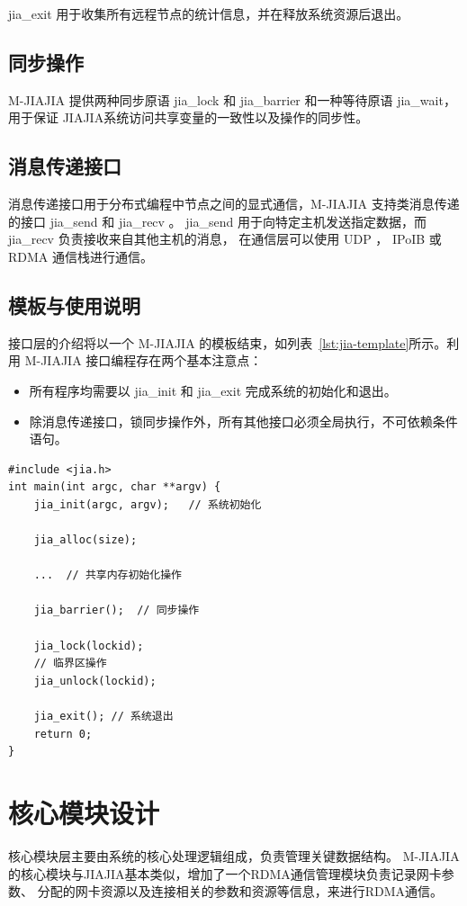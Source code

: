 {    jia\_exit 用于收集所有远程节点的统计信息，并在释放系统资源后退出。
    \subsection{同步操作}
    M-JIAJIA 提供两种同步原语 jia\_lock 和 jia\_barrier 和一种等待原语 jia\_wait，
    用于保证 JIAJIA系统访问共享变量的一致性以及操作的同步性。

    \subsection{消息传递接口}
    消息传递接口用于分布式编程中节点之间的显式通信，M-JIAJIA 支持类消息传递的接口 jia\_send 和 jia\_recv 。
    jia\_send 用于向特定主机发送指定数据，而 jia\_recv 负责接收来自其他主机的消息，
    在通信层可以使用 UDP ， IPoIB 或 RDMA 通信栈进行通信。

    \newpage
    \subsection{模板与使用说明}
    接口层的介绍将以一个 M-JIAJIA 的模板结束，如列表~\ref{lst:jia-template}所示。利用 M-JIAJIA 接口编程存在两个基本注意点：
    \begin{itemize}
        \item 所有程序均需要以 jia\_init 和 jia\_exit 完成系统的初始化和退出。
        \item 除消息传递接口，锁同步操作外，所有其他接口必须全局执行，不可依赖条件语句。
    \end{itemize}
    \begin{lstlisting}[style=CStyle, caption={M-JIAJIA 应用模板}, label={lst:jia-template}]
#include <jia.h>
int main(int argc, char **argv) {
    jia_init(argc, argv);   // 系统初始化

    jia_alloc(size);
    
    ...  // 共享内存初始化操作

    jia_barrier();  // 同步操作    

    jia_lock(lockid);
    // 临界区操作
    jia_unlock(lockid);
    
    jia_exit(); // 系统退出
    return 0;
}
    \end{lstlisting}

    \section{核心模块设计}\label{sec:核心模块设计}
    核心模块层主要由系统的核心处理逻辑组成，负责管理关键数据结构。
    M-JIAJIA的核心模块与JIAJIA基本类似，增加了一个RDMA通信管理模块负责记录网卡参数、
    分配的网卡资源以及连接相关的参数和资源等信息，来进行RDMA通信。

}
